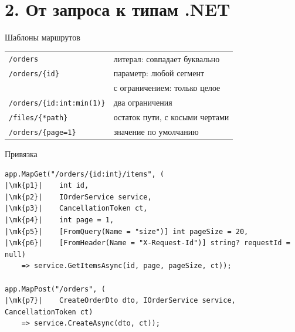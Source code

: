 \documentclass[aspectratio=169,10pt,t]{beamer}
\newcommand{\codexs}{\ttfamily\fontsize{7.0}{8.3}\selectfont}
\newcommand{\mk}[1]{\tikz[remember picture,overlay]\coordinate (#1) at (0,0.55ex);}
\begin{document}
\section{2. От запроса к типам .NET}

\begin{frame}[plain]
\end{frame}

\begin{frame}{Шаблоны маршрутов}
  \slidetop

  {\renewcommand{\arraystretch}{1.35}
  \begin{tabular}{@{}L{5.6cm}L{7.2cm}@{}}
    \texttt{/orders}                  & литерал: совпадает буквально \\
    \texttt{/orders/\{id\}}           & параметр: любой сегмент \\
      & с ограничением: только целое \\
    \texttt{/orders/\{id:int:min(1)\}} & два ограничения \\
    \texttt{/files/\{*path\}}         & остаток пути, с косыми чертами \\
    \texttt{/orders/\{page=1\}}       & значение по умолчанию \\
  \end{tabular}}
\end{frame}

\begin{frame}[fragile]{Привязка}
  \vspace{0.3em}
\begin{lstlisting}[style=csharp,basicstyle=\codexs,escapechar=|]
app.MapGet("/orders/{id:int}/items", (
|\mk{p1}|    int id,
|\mk{p2}|    IOrderService service,
|\mk{p3}|    CancellationToken ct,
|\mk{p4}|    int page = 1,
|\mk{p5}|    [FromQuery(Name = "size")] int pageSize = 20,
|\mk{p6}|    [FromHeader(Name = "X-Request-Id")] string? requestId = null)
    => service.GetItemsAsync(id, page, pageSize, ct));

app.MapPost("/orders", (
|\mk{p7}|    CreateOrderDto dto, IOrderService service, CancellationToken ct)
    => service.CreateAsync(dto, ct));
\end{lstlisting}

  \slidegap
\end{frame}
\end{document}

